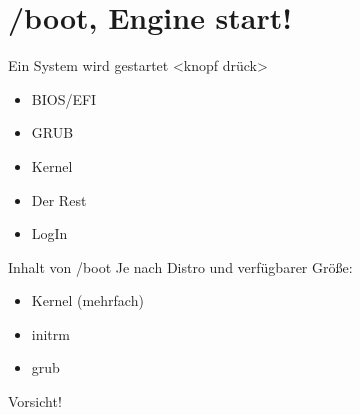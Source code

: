 \section[/boot]{/boot, Engine start!}
\begin{frame}{Ein System wird gestartet}
<knopf drück>
\begin{itemize}
 \item BIOS/EFI
 \item GRUB
 \item Kernel
 \item Der Rest
 \item LogIn
\end{itemize}

\end{frame}

\begin{frame}{Inhalt von /boot}
Je nach Distro und verfügbarer Größe:
\begin{itemize}
 \item Kernel (mehrfach)
 \item initrm
 \item grub
\end{itemize}
\begin{center}
{\large Vorsicht!}
 
\end{center}

\end{frame}